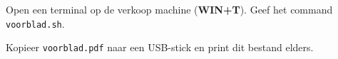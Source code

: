 Open een terminal op de verkoop machine (\textbf{WIN+T}). Geef het command \texttt{voorblad.sh}.

Kopieer \texttt{voorblad.pdf} naar een USB-stick en print dit bestand elders.
